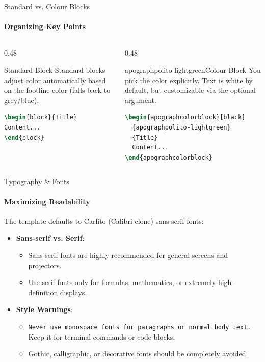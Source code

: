 \begin{frame}[fragile]{Standard vs. Colour Blocks}
\framesubtitle{Organizing Key Points}
\begin{columns}[T]
    \begin{column}{0.48\textwidth}
        \begin{block}{Standard Block}
        Standard blocks adjust color automatically based on the footline color (falls back to grey/blue).
\begin{lstlisting}[language=TeX]
\begin{block}{Title}
Content...
\end{block}
\end{lstlisting}
        \end{block}
    \end{column}
    \begin{column}{0.48\textwidth}
        \begin{apographcolorblock}[black]{apographpolito-lightgreen}{Colour Block}
        You pick the color explicitly. Text is white by default, but customizable via the optional argument.
\begin{lstlisting}[language=TeX]
\begin{apographcolorblock}[black]
  {apographpolito-lightgreen}
  {Title}
  Content...
\end{apographcolorblock}
\end{lstlisting}
        \end{apographcolorblock}
    \end{column}
\end{columns}
\end{frame}

\begin{frame}{Typography \& Fonts}
\framesubtitle{Maximizing Readability}
The template defaults to Carlito (Calibri clone) sans-serif fonts:
\begin{itemize}
    \item \textbf{Sans-serif vs. Serif}:
    \begin{itemize}
        \item \textsf{Sans-serif fonts} are highly recommended for general screens and projectors.
        \item \textrm{Use serif fonts only for formulas, mathematics, or extremely high-definition displays}.
    \end{itemize}
    \item \textbf{Style Warnings}:
    \begin{itemize}
        \item \texttt{Never use monospace fonts for paragraphs or normal body text.} Keep it for terminal commands or code blocks.
        \item {\frakfamily Gothic, calligraphic, or decorative fonts should be completely avoided.}
    \end{itemize}
\end{itemize}
\end{frame}
